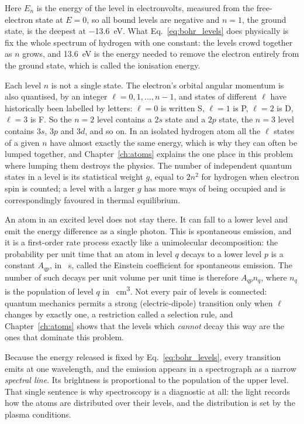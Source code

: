 \noindent Here $E_n$ is the energy of the level in electronvolts, measured from
the free-electron state at $E = 0$, so all bound levels are negative and $n = 1$,
the ground state, is the deepest at \SI{-13.6}{\electronvolt}. What
Eq.~\eqref{eq:bohr_levels} does physically is fix the whole spectrum of hydrogen
with one constant: the levels crowd together as $n$ grows, and \SI{13.6}{\electronvolt}
is the energy needed to remove the electron entirely from the ground state, which
is called the ionisation energy.

Each level $n$ is not a single state. The electron's orbital angular momentum is
also quantised, by an integer $\ell = 0, 1, \dots, n-1$, and states of different
$\ell$ have historically been labelled by letters: $\ell = 0$ is written S,
$\ell = 1$ is P, $\ell = 2$ is D, $\ell = 3$ is F. So the $n = 2$ level contains
a $2s$ state and a $2p$ state, the $n=3$ level contains $3s$, $3p$ and $3d$, and
so on. In an isolated hydrogen atom all the $\ell$ states of a given $n$ have
almost exactly the same energy, which is why they can often be lumped together,
and Chapter~\ref{ch:atoms} explains the one place in this problem where
lumping them destroys the physics. The number of independent quantum states in a
level is its statistical weight $g$, equal to $2n^{2}$ for hydrogen when electron
spin is counted; a level with a larger $g$ has more ways of being occupied and is
correspondingly favoured in thermal equilibrium.

An atom in an excited level does not stay there. It can fall to a lower level and
emit the energy difference as a single photon. This is spontaneous emission, and
it is a first-order rate process exactly like a unimolecular decomposition: the
probability per unit time that an atom in level $q$ decays to a lower level $p$
is a constant $A_{qp}$, in \si{\per\second}, called the Einstein coefficient for
spontaneous emission. The number of such decays per unit volume per unit time is
therefore $A_{qp}n_q$, where $n_q$ is the population of level $q$ in
\si{\per\cubic\centi\metre}. Not every pair of levels is connected: quantum
mechanics permits a strong (electric-dipole) transition only when $\ell$ changes
by exactly one, a restriction called a selection rule, and Chapter~\ref{ch:atoms}
shows that the levels which \emph{cannot} decay this way are the ones that
dominate this problem.

Because the energy released is fixed by Eq.~\eqref{eq:bohr_levels}, every
transition emits at one wavelength, and the emission appears in a spectrograph as
a narrow \emph{spectral line}. Its brightness is proportional to the population
of the upper level. That single sentence is why spectroscopy is a diagnostic at
all: the light records how the atoms are distributed over their levels, and the
distribution is set by the plasma conditions.

